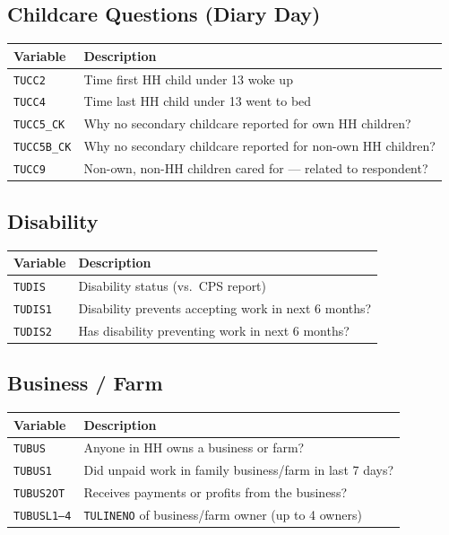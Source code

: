 \documentclass[11pt, a4paper]{article}
\begin{document}
\subsection{Childcare Questions (Diary Day)}
\begin{longtable}{L{3.8cm} L{12cm}}
\toprule \textbf{Variable} & \textbf{Description} \\ \midrule \endhead
\bottomrule \endfoot
\texttt{TUCC2}     & Time first HH child under 13 woke up \\
 \texttt{TUCC4}     & Time last HH child under 13 went to bed \\
\texttt{TUCC5\_CK} & Why no secondary childcare reported for own HH children? \\
 \texttt{TUCC5B\_CK}& Why no secondary childcare reported for non-own HH children? \\
\texttt{TUCC9}     & Non-own, non-HH children cared for --- related to respondent? \\
\end{longtable}

\subsection{Disability}
\begin{longtable}{L{3.8cm} L{12cm}}
\toprule \textbf{Variable} & \textbf{Description} \\ \midrule \endhead
\bottomrule \endfoot
\texttt{TUDIS}  & Disability status (vs.\ CPS report) \\
 \texttt{TUDIS1} & Disability prevents accepting work in next 6 months? \\
\texttt{TUDIS2} & Has disability preventing work in next 6 months? \\
\end{longtable}


\vspace{6cm}
\subsection{Business / Farm}
\begin{longtable}{L{3.8cm} L{12cm}}
\toprule \textbf{Variable} & \textbf{Description} \\ \midrule \endhead
\bottomrule \endfoot
\texttt{TUBUS}       & Anyone in HH owns a business or farm? \\
 \texttt{TUBUS1}      & Did unpaid work in family business/farm in last 7 days? \\
\texttt{TUBUS2OT}    & Receives payments or profits from the business? \\
 \texttt{TUBUSL1--4}  & \texttt{TULINENO} of business/farm owner (up to 4 owners) \\
\end{longtable}
\end{document}
